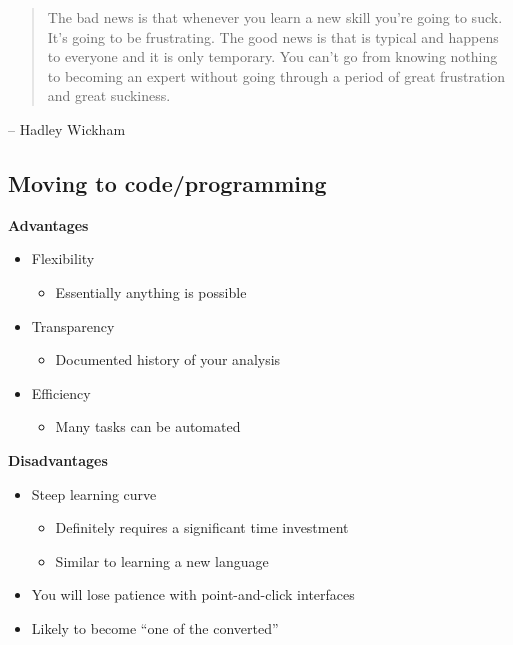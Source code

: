 \documentclass[
  letterpaper,
  DIV=11,
  numbers=noendperiod,
  oneside]{scrartcl}
\providecommand{\tightlist}{%
  \setlength{\itemsep}{0pt}\setlength{\parskip}{0pt}}\usepackage{longtable,booktabs,array}
\begin{document}
\begin{quote}
The bad news is that whenever you learn a new skill you're going to
suck. It's going to be frustrating. The good news is that is typical and
happens to everyone and it is only temporary. You can't go from knowing
nothing to becoming an expert without going through a period of great
frustration and great suckiness.
\end{quote}

-- Hadley Wickham

\hypertarget{moving-to-codeprogramming}{%
\subsection{Moving to
code/programming}\label{moving-to-codeprogramming}}

\textbf{Advantages}

\begin{itemize}
\tightlist
\item
  Flexibility

  \begin{itemize}
  \tightlist
  \item
    Essentially anything is possible
  \end{itemize}
\item
  Transparency

  \begin{itemize}
  \tightlist
  \item
    Documented history of your analysis
  \end{itemize}
\item
  Efficiency

  \begin{itemize}
  \tightlist
  \item
    Many tasks can be automated
  \end{itemize}
\end{itemize}

\textbf{Disadvantages}

\begin{itemize}
\tightlist
\item
  Steep learning curve

  \begin{itemize}
  \tightlist
  \item
    Definitely requires a significant time investment
  \item
    Similar to learning a new language
  \end{itemize}
\item
  You will lose patience with point-and-click interfaces
\item
  Likely to become ``one of the converted''
\end{itemize}
\end{document}

